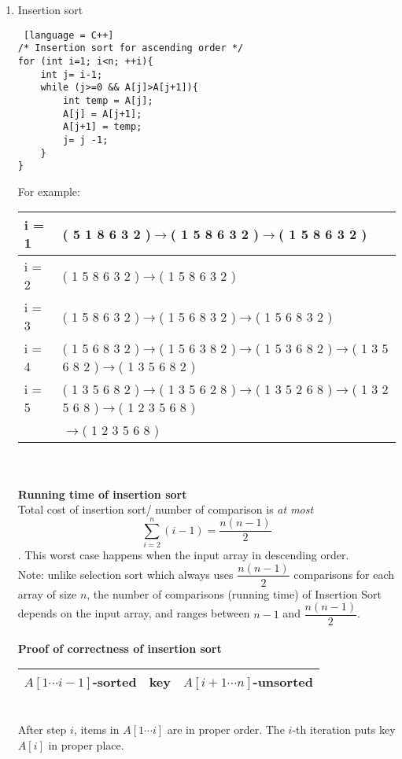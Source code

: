 \documentclass[11pt]{article}
\begin{document}
\begin{enumerate}
\begin{enumerate}
\begin{enumerate}
\item Insertion sort
\begin{lstlisting} [language = C++]
/* Insertion sort for ascending order */
for (int i=1; i<n; ++i){
	int j= i-1;
	while (j>=0 && A[j]>A[j+1]){
		int temp = A[j];
		A[j] = A[j+1];
		A[j+1] = temp;
		j= j -1;	
	}
}
\end{lstlisting}
For example:\\
\begin{tabular}{|l|l|}
\hline
i = 1& ( 5 1 8 6 3 2 )$\rightarrow$( 1 5 8 6 3 2 )$\rightarrow$( 1 5 8 6 3 2 )\\
\hline
i = 2& ( 1 5 8 6 3 2 )$\rightarrow$( 1 5 8 6 3 2 )\\
\hline
i = 3& ( 1 5 8 6 3 2 )$\rightarrow$( 1 5 6 8 3 2 )$\rightarrow$( 1 5 6 8 3 2 )\\
\hline
i = 4& ( 1 5 6 8 3 2 )$\rightarrow$( 1 5 6 3 8 2 )$\rightarrow$( 1 5 3 6 8 2 )$\rightarrow$( 1 3 5 6 8 2 )$\rightarrow$( 1 3 5 6 8 2 )\\
\hline
i = 5& ( 1 3 5 6 8 2 )$\rightarrow$( 1 3 5 6 2 8 )$\rightarrow$( 1 3 5 2 6 8 )$\rightarrow$( 1 3 2 5 6 8 )$\rightarrow$( 1 2 3 5 6 8 )\\
&$\rightarrow$( 1 2 3 5 6 8 )\\
\hline
\end{tabular}\\\\
\textbf{Running time of insertion sort}\\
Total cost of insertion sort/ number of comparison is \textit{at most} $$\sum_{i=2}^{n} (i-1) = \dfrac{n(n-1)}{2}$$
. This worst case happens when the input array in descending order.\\
Note: unlike selection sort which always uses $\dfrac{n(n-1)}{2}$ comparisons for each array of size $n$, the number of comparisons (running time) of Insertion Sort depends on the input array, and ranges between $n-1$ and $\dfrac{n(n-1)}{2}$.\\\\
\textbf{Proof of correctness of insertion sort}\\
\begin{tabular}{|p{4cm}|c|p{6cm}|}
\hline
$A[1 \cdots i-1]$-sorted&key& $A[i+1 \cdots n]$-unsorted\\
\hline
\end{tabular}\\
After step $i$, items in $A[1 \cdots i]$ are in proper order. The $i$-th iteration puts key $A[i]$ in proper place.


\end{enumerate}
\end{enumerate}
\end{enumerate}
\end{document}
